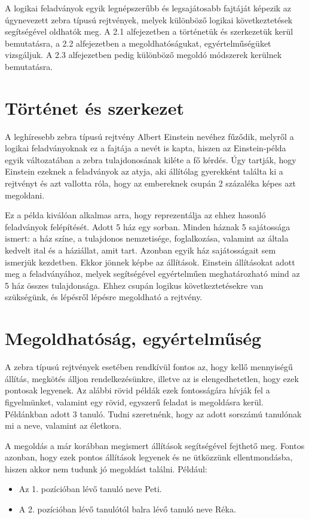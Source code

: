 \documentclass[12pt,a4paper,oneside]{report}
\begin{document}
A logikai feladványok egyik legnépszerűbb és legsajátosabb fajtáját képezik az úgynevezett zebra típusú rejtvények, melyek különböző logikai következtetések segítségével oldhatók meg. 
A 2.1 alfejezetben a történetük és szerkezetük kerül bemutatásra, a 2.2 alfejezetben a megoldhatóságukat, egyértelműségüket vizsgáljuk.
A 2.3 alfejezetben pedig különböző megoldó módszerek kerülnek bemutatásra.
    
    \section{Történet és szerkezet} %

A leghíresebb zebra típusú rejtvény Albert Einstein nevéhez fűződik, melyről a logikai feladványoknak ez a fajtája a nevét is kapta, hiszen az Einstein-példa egyik változatában a zebra tulajdonosának kiléte a fő kérdés. 
Úgy tartják, hogy Einstein ezeknek a feladványok az atyja, aki állítólag gyerekként találta ki a rejtvényt és azt vallotta róla, hogy az embereknek csupán 2 százaléka képes azt megoldani.

Ez a példa kiválóan alkalmas arra, hogy reprezentálja az ehhez hasonló feladványok felépítését.
Adott 5 ház egy sorban. Minden háznak 5 sajátossága ismert: a ház színe, a tulajdonos nemzetisége, foglalkozása, valamint az általa kedvelt ital és a háziállat, amit tart. 
Azonban egyik ház sajátosságait sem ismerjük kezdetben. 
Ekkor jönnek képbe az állítások. Einstein állításokat adott meg a feladványához, melyek segítségével egyértelműen meghatározható mind az 5 ház összes tulajdonsága. 
Ehhez csupán logikus következtetésekre van szükségünk, és lépésről lépésre megoldható a rejtvény.



    \section{Megoldhatóság, egyértelműség} %

A zebra típusú rejtvények esetében rendkívül fontos az, hogy kellő mennyiségű állítás, megkötés álljon rendelkezésünkre, illetve az is elengedhetetlen, hogy ezek pontosak legyenek. 
Az alábbi rövid példák ezek fontosságára hívják fel a figyelmünket, valamint egy rövid, egyszerű feladat is megoldásra kerül.
Példánkban adott 3 tanuló. 
Tudni szeretnénk, hogy az adott sorszámú tanulónak mi a neve, valamint az életkora.

A megoldás a már korábban megismert állítások segítségével fejthető meg. 
Fontos azonban, hogy ezek pontos állítások legyenek és ne ütközzünk ellentmondásba, hiszen akkor nem tudunk jó megoldást találni. 
Például:
\begin{itemize}
\item Az 1. pozícióban lévő tanuló neve Peti.
\item A 2. pozícióban lévő tanulótól balra lévő tanuló neve Réka.
\end{itemize}
\end{document}
